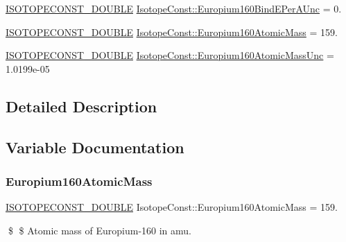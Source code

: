 \begin{DoxyCompactItemize}
\mbox{\hyperlink{group___isotope_const-_macros_ga8f45a7272ce02c0b4c65c44636ed719a}{I\+S\+O\+T\+O\+P\+E\+C\+O\+N\+S\+T\+\_\+\+D\+O\+U\+B\+LE}} \mbox{\hyperlink{group___isotope_const-_europium-_eu160_ga1b1e35b20db456914abada24e9bfb042}{Isotope\+Const\+::\+Europium160\+Bind\+E\+Per\+A\+Unc}} = 0.
\item 
\mbox{\hyperlink{group___isotope_const-_macros_ga8f45a7272ce02c0b4c65c44636ed719a}{I\+S\+O\+T\+O\+P\+E\+C\+O\+N\+S\+T\+\_\+\+D\+O\+U\+B\+LE}} \mbox{\hyperlink{group___isotope_const-_europium-_eu160_ga817551d026382607fb273da5f298de55}{Isotope\+Const\+::\+Europium160\+Atomic\+Mass}} = 159.
\item 
\mbox{\hyperlink{group___isotope_const-_macros_ga8f45a7272ce02c0b4c65c44636ed719a}{I\+S\+O\+T\+O\+P\+E\+C\+O\+N\+S\+T\+\_\+\+D\+O\+U\+B\+LE}} \mbox{\hyperlink{group___isotope_const-_europium-_eu160_gaae20bb6d3774f08e22cca9b66f2ce570}{Isotope\+Const\+::\+Europium160\+Atomic\+Mass\+Unc}} = 1.\+0199e-\/05
\end{DoxyCompactItemize}


\subsection{Detailed Description}


\subsection{Variable Documentation}
\mbox{\label{group___isotope_const-_europium-_eu160_ga817551d026382607fb273da5f298de55}} 
\subsubsection{\texorpdfstring{Europium160\+Atomic\+Mass}{Europium160AtomicMass}}
{\footnotesize\ttfamily \mbox{\hyperlink{group___isotope_const-_macros_ga8f45a7272ce02c0b4c65c44636ed719a}{I\+S\+O\+T\+O\+P\+E\+C\+O\+N\+S\+T\+\_\+\+D\+O\+U\+B\+LE}} Isotope\+Const\+::\+Europium160\+Atomic\+Mass = 159.}

\$ \$ Atomic mass of Europium-\/160 in amu. \mbox{\label{group___isotope_const-_europium-_eu160_gaae20bb6d3774f08e22cca9b66f2ce570}} 
